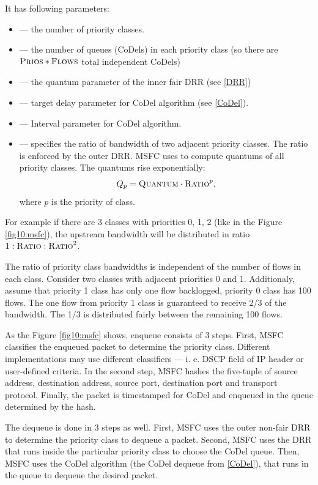 It has following parameters:
\begin{itemize}
	\item {} --- the number of priority classes.
	\item {} --- the number of queues (CoDels) in each priority class (so there are $\textsc{Prios}*\textsc{Flows}$ total independent CoDels)
	\item {} --- the quantum parameter of the inner fair DRR (see \autoref{DRR})
	\item {} --- target delay parameter for CoDel algorithm (see \autoref{CoDel}).
	\item {} --- Interval parameter for CoDel algorithm.
	\item {} --- specifies the ratio of bandwidth of two adjacent priority classes. The ratio is enforced by the outer DRR. MSFC uses  to compute quantums of all priority classes. The quantums rise exponentially:
	\[
	Q_p = \textsc{Quantum} \cdot \textsc{Ratio}^p,
	\]
	where $p$ is the priority of class.
\end{itemize}
For example if there are 3 classes with priorities 0, 1, 2 (like in the Figure \ref{fig10:msfc}), the upstream bandwidth will be distributed in ratio $1:\textsc{Ratio}:\textsc{Ratio}^2$.

The ratio of priority class bandwidths is independent of the number of flows in each class. Consider two classes with adjacent priorities 0 and 1. Additionaly, assume that priority 1 class has only one flow backlogged, priority 0 class has 100 flows. The one flow from priority 1 class is guaranteed to receive 2/3 of the bandwidth. The 1/3 is distributed fairly between the remaining 100 flows.

As the Figure \ref{fig10:msfc} shows, enqueue consists of 3 steps. First, MSFC classifies the enqueued packet to determine the priority class. Different implementations may use different classifiers --- i. e. DSCP field of IP header or user-defined criteria. In the second step, MSFC hashes the five-tuple of source address, destination address, source port, destination port and transport protocol. Finally, the packet is timestamped for CoDel and enqueued in the queue determined by the hash.

The dequeue is done in 3 steps as well. First, MSFC uses the outer non-fair DRR to determine the priority class to dequeue a packet. Second, MSFC uses the DRR that runs inside the particular priority class to choose the CoDel queue. Then, MSFC uses the CoDel algorithm (the CoDel dequeue from \autoref{CoDel}), that runs in the queue to dequeue the desired packet.

